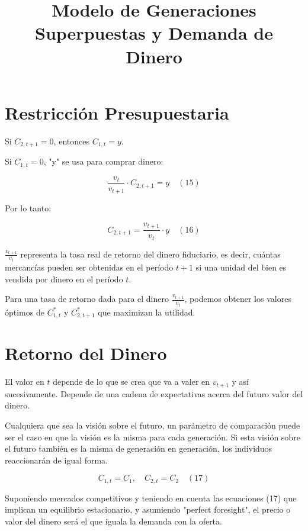 \documentclass{article}
\title{Modelo de Generaciones Superpuestas y Demanda de Dinero}
\author{}
\date{}
\begin{document}
\maketitle

\section{Restricción Presupuestaria}

Si \( C_{2,t+1} = 0 \), entonces \( C_{1,t} = y \).

Si \( C_{1,t} = 0 \), "y" se usa para comprar dinero:

\begin{equation}
\frac{v_t}{v_{t+1}} \cdot C_{2,t+1} = y \quad (15)
\end{equation}

Por lo tanto:

\begin{equation}
C_{2,t+1} = \frac{v_{t+1}}{v_t} \cdot y \quad (16)
\end{equation}

\(\frac{v_{t+1}}{v_t}\) representa la tasa real de retorno del dinero fiduciario, es decir, cuántas mercancías pueden ser obtenidas en el período \( t+1 \) si una unidad del bien es vendida por dinero en el período \( t \).

Para una tasa de retorno dada para el dinero \( \frac{v_{t+1}}{v_t} \), podemos obtener los valores óptimos de \( C^*_{1,t} \) y \( C^*_{2,t+1} \) que maximizan la utilidad.

\section{Retorno del Dinero}

El valor en \( t \) depende de lo que se crea que va a valer en \( v_{t+1} \) y así sucesivamente. Depende de una cadena de expectativas acerca del futuro valor del dinero.

Cualquiera que sea la visión sobre el futuro, un parámetro de comparación puede ser el caso en que la visión es la misma para cada generación. Si esta visión sobre el futuro también es la misma de generación en generación, los individuos reaccionarán de igual forma.

\begin{equation}
C_{1,t} = C_1, \quad C_{2,t} = C_2 \quad (17)
\end{equation}

Suponiendo mercados competitivos y teniendo en cuenta las ecuaciones (17) que implican un equilibrio estacionario, y asumiendo "perfect foresight", el precio o valor del dinero será el que iguala la demanda con la oferta.
\end{document}
